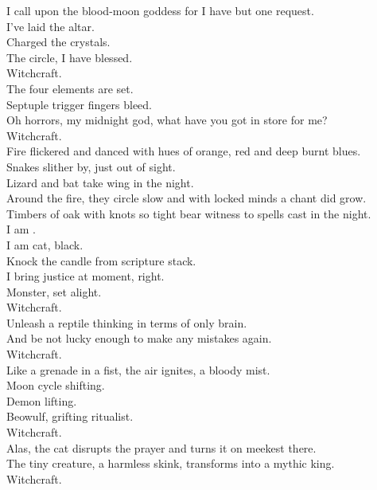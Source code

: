 I call upon the blood-moon goddess for I have but one request. \\
I've laid the altar. \\
Charged the crystals. \\
The circle, I have blessed. \\
Witchcraft. \\
The four elements are set. \\
Septuple trigger fingers bleed. \\
Oh horrors, my midnight god, what have you got in store for me? \\
Witchcraft. \\

Fire flickered and danced with hues of orange, red and deep burnt blues. \\
Snakes slither by, just out of sight. \\
Lizard and bat take wing in the night. \\
Around the fire, they circle slow and with locked minds a chant did grow. \\
Timbers of oak with knots so tight bear witness to spells cast in the night. \\

I am . \\
I am cat, black. \\
Knock the candle from scripture stack. \\
I bring justice at moment, right. \\
 Monster, set alight. \\
Witchcraft. \\
Unleash a reptile thinking in terms of only  brain. \\
And be not lucky enough to make any mistakes again. \\
Witchcraft. \\
Like a grenade in a fist, the air ignites, a bloody mist. \\
Moon cycle shifting. \\
Demon lifting. \\
Beowulf, grifting ritualist. \\
Witchcraft. \\
Alas, the cat disrupts the prayer and turns it on meekest there. \\
The tiny creature, a harmless skink, transforms into a mythic king. \\
Witchcraft. \\

